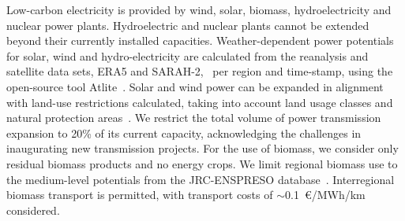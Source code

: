 \documentclass[twocolumn]{article}
\begin{document}

Low-carbon electricity is provided by wind, solar, biomass, hydroelectricity and nuclear power plants. Hydroelectric and nuclear plants cannot be extended beyond their currently installed capacities. Weather-dependent power potentials for solar, wind and hydro-electricity are calculated from the reanalysis and satellite data sets, ERA5 and SARAH-2,~\cite{hersbachERA5GlobalReanalysis2020,pfeifrothSurfaceRadiationData2017} per region and time-stamp, using the open-source tool Atlite~\cite{hofmannAtliteLightweightPython2021}.
Solar and wind power can be expanded in alignment with land-use restrictions calculated, taking into account land usage classes and natural protection areas~\cite{eeaCorineLandCover2012,eeaNatura2000Data2016}. We restrict the total volume of power transmission expansion to 20\% of its current capacity, acknowledging the challenges in inaugurating new transmission projects.
For the use of biomass, we consider only residual biomass products and no energy crops. We limit regional biomass use to the medium-level potentials from the JRC-ENSPRESO database~\cite{enspreso_database,instituteforenergyandtransportjointresearchcentreJRCEUTIMESModelBioenergy2015}. Interregional biomass transport is permitted, with transport costs of $\sim$0.1~€/MWh/km considered.

\end{document}
